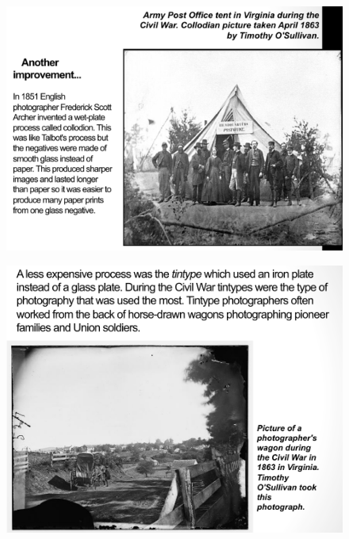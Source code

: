 \documentclass{beamer}
\begin{document}
\begin{frame}
	\begin{figure}
		\centering
		\includegraphics[scale=0.4]{89.jpg}
	\end{figure}
\end{frame}

\begin{frame}
	\begin{figure}
		\centering
		\includegraphics[scale=0.4]{90.jpg}
	\end{figure}
\end{frame}
\end{document}

